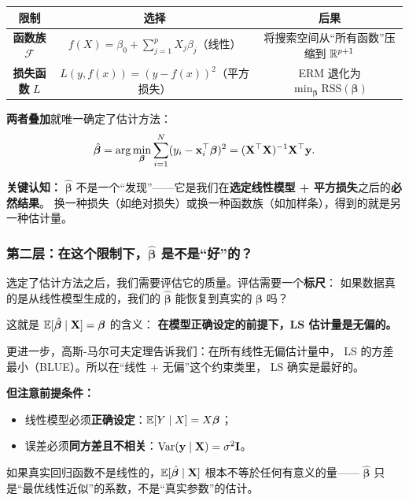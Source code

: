 \begin{center}
\begin{tabular}{c|c|c}
\toprule
\textbf{限制} & \textbf{选择} & \textbf{后果} \\
\midrule
\textbf{函数族} $\mathcal{F}$
    & $f(X) = \beta_0 + \sum_{j=1}^{p} X_j\beta_j$（线性）
    & 将搜索空间从``所有函数''压缩到 $\mathbb{R}^{p+1}$ \\
\textbf{损失函数} $L$
    & $L(y, f(x)) = (y - f(x))^2$（平方损失）
    & ERM 退化为 $\min_{\bm{\beta}} \mathrm{RSS}(\bm{\beta})$ \\
\bottomrule
\end{tabular}
\end{center}

\textbf{两者叠加}就唯一确定了估计方法：
\[
    \hat{\bm{\beta}} = \arg\min_{\bm{\beta}} \sum_{i=1}^{N} (y_i - \mathbf{x}_i^\top \bm{\beta})^2
    = (\mathbf{X}^\top \mathbf{X})^{-1} \mathbf{X}^\top \mathbf{y}.
\]

\textbf{关键认知：} $\hat{\bm{\beta}}$ 不是一个``发现''——它是我们在\textbf{选定线性模型 + 平方损失}之后的\textbf{必然结果}。
换一种损失（如绝对损失）或换一种函数族（如加样条），得到的就是另一种估计量。

\subsubsection{第二层：在这个限制下，$\hat{\bm{\beta}}$ 是不是``好''的？}

选定了估计方法之后，我们需要评估它的质量。评估需要一个\textbf{标尺}：
如果数据真的是从线性模型生成的，我们的 $\hat{\bm{\beta}}$ 能恢复到真实的 $\bm{\beta}$ 吗？

这就是 $\mathbb{E}[\hat{\bm{\beta}} \mid \mathbf{X}] = \bm{\beta}$ 的含义：
\textbf{在模型正确设定的前提下，LS 估计量是无偏的。}

更进一步，高斯-马尔可夫定理告诉我们：在所有线性无偏估计量中，
LS 的方差最小（BLUE）。所以在``线性 + 无偏''这个约束类里，
LS 确实是最好的。

\textbf{但注意前提条件：}
\begin{itemize}
    \item 线性模型必须\textbf{正确设定}：$\mathbb{E}[Y \mid X] = X\bm{\beta}$；
    \item 误差必须\textbf{同方差且不相关}：$\mathrm{Var}(\mathbf{y} \mid \mathbf{X}) = \sigma^2 \mathbf{I}$。
\end{itemize}
如果真实回归函数不是线性的，$\mathbb{E}[\hat{\bm{\beta}} \mid \mathbf{X}]$ 根本不等於任何有意义的量——
$\hat{\bm{\beta}}$ 只是``最优线性近似''的系数，不是``真实参数''的估计。

